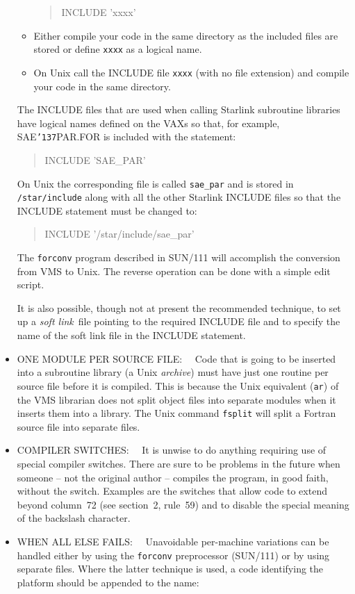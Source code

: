 \documentclass[twoside,11pt,nolof,noabs]{starlink}
\renewcommand{\_}{{\tt\char'137}}
\begin{document}
\begin{itemize}
\begin{itemize}
\begin{quote}
\begin{terminalv}
      INCLUDE 'xxxx'
    \end{terminalv}
    \end{quote}
   \item Either compile your code in the same directory as the included files
    are stored or define \verb|xxxx| as a logical name.
   \item On Unix call the INCLUDE file \verb|xxxx| (with no file extension) and
    compile your code in the same directory.
  \end{itemize}
  The INCLUDE files that are used when calling Starlink subroutine
  libraries have logical names defined on the VAXs so that, for example,
  SAE\_PAR.FOR is included with the statement:
    \begin{quote}
    \begin{terminalv}
      INCLUDE 'SAE_PAR'
    \end{terminalv}
    \end{quote}
  On Unix the corresponding file is called \verb|sae_par| and is stored in
  \verb|/star/include| along with all the other Starlink INCLUDE files so that
  the INCLUDE statement must be changed to:
    \begin{quote}
    \begin{terminalv}
      INCLUDE '/star/include/sae_par'
    \end{terminalv}
    \end{quote}
  The \verb|forconv| program
  described in SUN/111 will accomplish the conversion from VMS
  to Unix. The reverse operation can be done with a simple edit script.

  It is also possible, though not at present the recommended
  technique, to set up a \textit{soft link}\, file pointing to the required
  INCLUDE file and to specify the name of the soft link file in
  the INCLUDE statement.
 \item ONE MODULE PER SOURCE FILE:~~
  Code that is going to be inserted into a subroutine library (a Unix
  \textit{archive}) must have just one routine per source file before it is
  compiled.  This is because the Unix equivalent (\verb|ar|) of the VMS
  librarian does not split object files into separate modules when it inserts
  them into a library.  The Unix command \verb|fsplit| will split a Fortran
  source file into separate files.
 \item COMPILER SWITCHES:~~
  It is unwise to do anything requiring use of special compiler
  switches.  There are sure to be problems in the future when someone --
  not the original author -- compiles the program, in good faith,
  without the switch.  Examples are the switches that allow code
  to extend beyond column~72 (see section~2, rule~59) and
  to disable the special meaning of the backslash character.
 \item WHEN ALL ELSE FAILS:~~
   Unavoidable per-machine variations can be handled either by using the
   \verb|forconv| preprocessor (SUN/111) or by using separate files.
   Where the latter technique is used, a code identifying the platform
   should be appended to the name:


\end{itemize}
\end{document}
